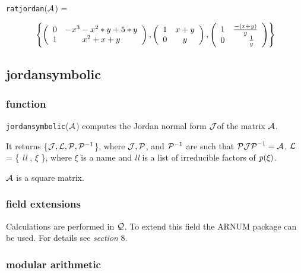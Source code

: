 {\tt ratjordan}(${\cal A}$) = 
\begin{center}
\begin{displaymath}
\left\{ \left( \begin{array}{cc} 0 & -x^3-x^2*y+5*y \\ 1 & 
x^2+x+y \end{array} \right), \left( \begin{array}{cc}
1 & x+y \\ 0 & y \end{array} \right), \left( \begin{array}{cc} 1 & 
\frac{-(x+y)}{y} \\ 0 & \hspace{0.2in} \frac{1}{y} \end{array} \right) 
\right\}
\end{displaymath}
\end{center}


\subsection{jordansymbolic}

\subsubsection{function}

{\tt jordansymbolic}(${\cal A}$) \hspace{0in} computes the Jordan 
normal form ${\cal J}$of the matrix ${\cal A}$.

It returns \{${\cal J}, {\cal L}, {\cal P}, {\cal P}^{-1}$\}, where 
${\cal J}, {\cal P}$, and ${\cal P}^{-1}$ are such that ${\cal P J P}^
{-1} = {\cal A}$. ${\cal L}$ = \{ {\it ll} , $\xi$ \}, where $\xi$ is 
a name and {\it ll} is a list of irreducible factors of ${\it p}(\xi)$.

${\cal A}$ is a square matrix.

\subsubsection{field extensions}

Calculations are performed in ${\cal Q}$. To extend this field the 
{\small ARNUM} package can be used. For details see {\it section} 8.

\subsubsection{modular arithmetic}

